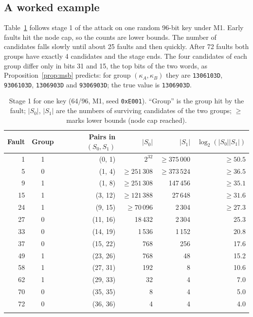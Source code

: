 \documentclass[pdflatex,sn-mathphys-num]{sn-jnl}
\theoremstyle{thmstyleone}%
\theoremstyle{thmstylethree}%
\begin{document}
\subsection{A worked example}

Table~\ref{tab:example} follows stage 1 of the attack on one random 96-bit key under M1. Early faults
hit the node cap, so the counts are lower bounds. The number of candidates falls slowly until about 25
faults and then quickly. After 72 faults both groups have exactly 4 candidates and the stage ends. The
four candidates of each group differ only in bits 31 and 15, the top bits of the two words, as
Proposition~\ref{prop:msb} predicts: for group $(\kappa_A,\kappa_B)$ they are \texttt{1306103D},
\texttt{9306103D}, \texttt{1306903D} and \texttt{9306903D}; the true value is \texttt{1306903D}.

\begin{table}[t]
\caption{Stage 1 for one key (64/96, M1, seed \texttt{0xE001}). ``Group'' is the group hit by the fault;
$|S_0|$, $|S_1|$ are the numbers of surviving candidates of the two groups; $\geq$ marks lower bounds
(node cap reached).}\label{tab:example}
\begin{tabular}{@{}rcrrrr@{}}
\toprule
Fault & Group & Pairs in $(S_0,S_1)$ & $|S_0|$ & $|S_1|$ & $\log_2(|S_0||S_1|)$\\
\midrule
1 & 1 & (0, 1) & $2^{32}$ & $\geq 375\,000$ & $\geq 50.5$\\
5 & 0 & (1, 4) & $\geq 251\,308$ & $\geq 373\,524$ & $\geq 36.5$\\
9 & 1 & (1, 8) & $\geq 251\,308$ & 147\,456 & $\geq 35.1$\\
15 & 1 & (3, 12) & $\geq 121\,388$ & 27\,648 & $\geq 31.6$\\
24 & 1 & (9, 15) & $\geq 70\,096$ & 2\,304 & $\geq 27.3$\\
27 & 0 & (11, 16) & 18\,432 & 2\,304 & 25.3\\
33 & 0 & (14, 19) & 1\,536 & 1\,152 & 20.8\\
37 & 0 & (15, 22) & 768 & 256 & 17.6\\
49 & 1 & (23, 26) & 768 & 48 & 15.2\\
58 & 1 & (27, 31) & 192 & 8 & 10.6\\
62 & 1 & (29, 33) & 32 & 4 & 7.0\\
70 & 0 & (35, 35) & 8 & 4 & 5.0\\
72 & 0 & (36, 36) & 4 & 4 & 4.0\\
\botrule
\end{tabular}
\end{table}
\end{document}
